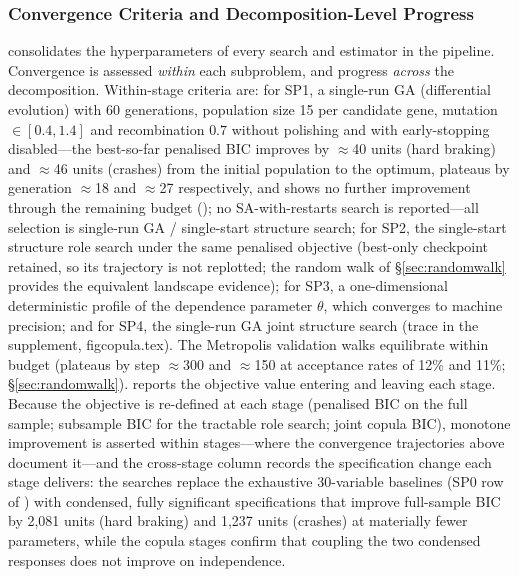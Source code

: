 \documentclass[letterpaper,8pt]{extarticle}  %
\newcommand{\file}[1]{{\ttfamily\def\_{\textunderscore\allowbreak}#1}}
\begin{document}
\begin{doublespacing}
\begin{linenumbers}
\subsubsection*{Convergence Criteria and Decomposition-Level Progress}

 consolidates the hyperparameters of every search and estimator in the pipeline. Convergence is assessed \emph{within} each subproblem, and progress \emph{across} the decomposition. Within-stage criteria are: for SP1, a single-run GA (differential evolution) with 60 generations, population size 15 per candidate gene, mutation $\in[0.4,1.4]$ and recombination $0.7$ without polishing and with early-stopping disabled---the best-so-far penalised BIC improves by $\approx$40 units (hard braking) and $\approx$46 units (crashes) from the initial population to the optimum, plateaus by generation $\approx$18 and $\approx$27 respectively, and shows no further improvement through the remaining budget (); no SA-with-restarts search is reported---all selection is single-run GA / single-start structure search; for SP2, the single-start structure role search under the same penalised objective (best-only checkpoint retained, so its trajectory is not replotted; the random walk of \S\ref{sec:randomwalk} provides the equivalent landscape evidence); for SP3, a one-dimensional deterministic profile of the dependence parameter $\theta$, which converges to machine precision; and for SP4, the single-run GA joint structure search (trace in the supplement, \file{fig\_copula.tex}). The Metropolis validation walks equilibrate within budget (plateaus by step $\approx$300 and $\approx$150 at acceptance rates of 12\% and 11\%; \S\ref{sec:randomwalk}).  reports the objective value entering and leaving each stage. Because the objective is re-defined at each stage (penalised BIC on the full sample; subsample BIC for the tractable role search; joint copula BIC), monotone improvement is asserted within stages---where the convergence trajectories above document it---and the cross-stage column records the specification change each stage delivers: the searches replace the exhaustive 30-variable baselines (SP0 row of ) with condensed, fully significant specifications that improve full-sample BIC by 2{,}081 units (hard braking) and 1{,}237 units (crashes) at materially fewer parameters, while the copula stages confirm that coupling the two condensed responses does not improve on independence.


\end{linenumbers}
\end{doublespacing}
\end{document}

